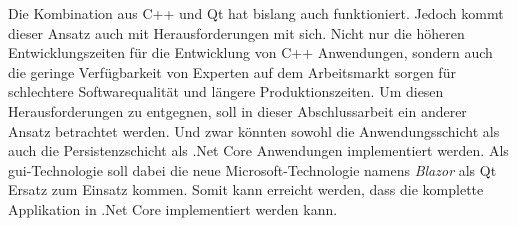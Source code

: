 \newline
Die Kombination aus C++ und Qt hat bislang auch funktioniert. Jedoch kommt dieser Ansatz
auch mit Herausforderungen mit sich. Nicht nur die höheren Entwicklungszeiten für die
Entwicklung von C++ Anwendungen, sondern auch die geringe Verfügbarkeit von Experten auf dem
Arbeitsmarkt sorgen für schlechtere Softwarequalität und längere Produktionszeiten.
\newline
\newline
Um diesen Herausforderungen zu entgegnen, soll in dieser Abschlussarbeit ein anderer Ansatz
betrachtet
werden. Und zwar könnten sowohl die Anwendungsschicht als auch die Persistenzschicht als .Net
Core Anwendungen implementiert werden. Als \ac{gui}-Technologie soll dabei die neue
Microsoft-Technologie namens \emph{Blazor} als Qt Ersatz zum Einsatz kommen. Somit kann erreicht
werden, dass die komplette Applikation in .Net Core implementiert werden kann.



